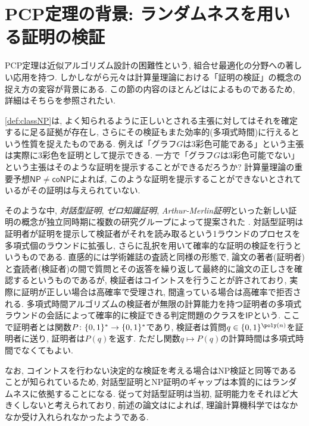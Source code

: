 \section{PCP定理の背景: ランダムネスを用いる証明の検証}
PCP定理は近似アルゴリズム設計の困難性という, 組合せ最適化の分野への著しい応用を持つ. しかしながら元々は計算量理論における「証明の検証」の概念の捉え方の変容が背景にある.
この節の内容のほとんどは\cite{history-of-PCP}によるものであるため,
詳細はそちらを参照されたい.

\cref{def:classNP}は, よく知られるように正しいとされる主張に対してはそれを確定するに足る証拠が存在し, さらにその検証もまた効率的(多項式時間)に行えるという性質を捉えたものである.
例えば「グラフ$G$は3彩色可能である」という主張は実際に3彩色を証明として提示できる.
一方で「グラフ$G$は3彩色可能でない」という主張はそのような証明を提示することができるだろうか?
計算量理論の重要予想$\mathsf{NP}\ne\mathsf{coNP}$によれば, このような証明を提示することができないとされているがその証明は与えられていない.

そのような中, \emph{対話型証明}, \emph{ゼロ知識証明}, \emph{Arthur-Merlin証明}といった新しい証明の概念が独立同時期に複数の研究グループによって提案された \citet{GMR85,Babai1985}.
対話型証明は証明者が証明を提示して検証者がそれを読み取るという1ラウンドのプロセスを多項式個のラウンドに拡張し, さらに乱択を用いて確率的な証明の検証を行うというものである.
直感的には学術雑誌の査読と同様の形態で, 論文の著者(証明者)と査読者(検証者)の間で質問とその返答を繰り返して最終的に論文の正しさを確認するというものであるが, 検証者はコイントスを行うことが許されており, 実際に証明が正しい場合は高確率で受理され, 間違っている場合は高確率で拒否される.
多項式時間アルゴリズムの検証者が無限の計算能力を持つ証明者の多項式ラウンドの会話によって確率的に検証できる判定問題のクラスを$\mathsf{IP}$という.
ここで証明者とは関数$P\colon \{0,1\}^*\to\{0,1\}^*$であり, 検証者は質問$q\in\binset^{\poly(n)}$を証明者に送り, 証明者は$P(q)$を返す.
ただし関数$q\mapsto P(q)$の計算時間は多項式時間でなくてもよい.

なお, コイントスを行わない決定的な検証を考える場合はNP検証と同等であることが知られているため, 対話型証明とNP証明のギャップは本質的にはランダムネスに依拠することになる. 従って対話型証明は当初, 証明能力をそれほど大きくしないと考えられており, 前述の論文は\cite{history-of-PCP}によれば, 理論計算機科学ではなかなか受け入れられなかったようである.


